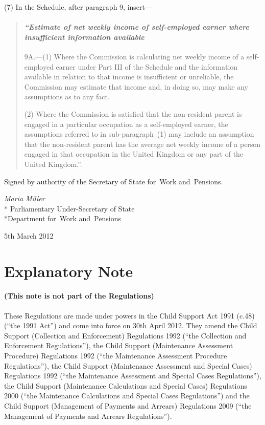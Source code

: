 \documentclass[12pt,a4paper]{article}
\begin{document}
(7) In the Schedule, after paragraph 9, insert—
\begin{quotation}
\subsection*{\sloppy\itshape “Estimate of net weekly income of self-\hspace{0pt}employed earner where insufficient information available}

9A.---(1)  Where the Commission is calculating net weekly income of a self-employed earner under Part III of the Schedule and the information available in relation to that income is insufficient or unreliable, the Commission may estimate that income and, in doing so, may make any assumptions as to any fact.

(2) Where the Commission is satisfied that the non-resident parent is engaged in a particular occupation as a self-employed earner, the assumptions referred to in sub-paragraph~(1) may include an assumption that the non-resident parent has the average net weekly income of a person engaged in that occupation in the United Kingdom or any part of the United Kingdom.”.
\end{quotation}

\bigskip

\pagebreak[3]

Signed 
by authority of the 
Secretary of State for~Work and~Pensions.

{\raggedleft
\emph{Maria Miller}\\*
Parliamentary Under-Secretary 
of State\\*Department 
for~Work and~Pensions

}

5th March 2012

\small

\part{Explanatory Note}

\renewcommand\parthead{— Explanatory Note}

\subsection*{(This note is not part of the Regulations)}

These Regulations are made under powers in the Child Support Act 1991 (c.48) (“the 1991 Act”) and come into force on 30th April 2012. They amend the Child Support (Collection and Enforcement) Regulations 1992 (“the Collection and Enforcement Regulations”), the Child Support (Maintenance Assessment Procedure) Regulations 1992 (“the Maintenance Assessment Procedure Regulations”), the Child Support (Maintenance Assessment and Special Cases) Regulations 1992 (“the Maintenance Assessment and Special Cases Regulations”), the Child Support (Maintenance Calculations and Special Cases) Regulations 2000 (“the Maintenance Calculations and Special Cases Regulations”) and the Child Support (Management of Payments and Arrears) Regulations 2009 (“the Management of Payments and Arrears Regulations”).
\end{document}
